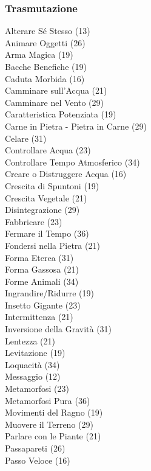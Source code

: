 \begin{multicols}{3}
	\subsubsection{Trasmutazione}
	Alterare Sé Stesso (13)		\\
	Animare Oggetti (26)\\
	Arma Magica (19)\\
	Bacche Benefiche (19)\\
	Caduta Morbida (16)\\
	Camminare sull'Acqua (21)\\
	Camminare nel Vento (29)\\
	Caratteristica Potenziata (19)\\
	Carne in Pietra - Pietra in Carne (29)\\
	Celare (31)\\
	Controllare Acqua (23)\\
	Controllare Tempo Atmosferico (34)\\
	Creare o Distruggere Acqua (16)\\
	Crescita di Spuntoni (19)\\
	Crescita Vegetale (21)\\
	Disintegrazione (29)\\
	Fabbricare (23)\\
	Fermare il Tempo (36)\\
	Fondersi nella Pietra (21)\\
	Forma Eterea (31)\\
	Forma Gassosa (21)\\
	Forme Animali (34)\\
	Ingrandire/Ridurre (19)\\
	Insetto Gigante (23)\\
	Intermittenza (21)\\
	Inversione della Gravità (31)\\
	Lentezza (21)\\
	Levitazione (19)\\
	Loquacità (34)\\
	Messaggio (12)\\
	Metamorfosi (23)\\
	Metamorfosi Pura (36)\\
	Movimenti del Ragno (19)\\
	Muovere il Terreno (29)\\
	Parlare con le Piante (21)\\
	Passapareti (26)\\
	Passo Veloce (16)\\

\end{multicols}

